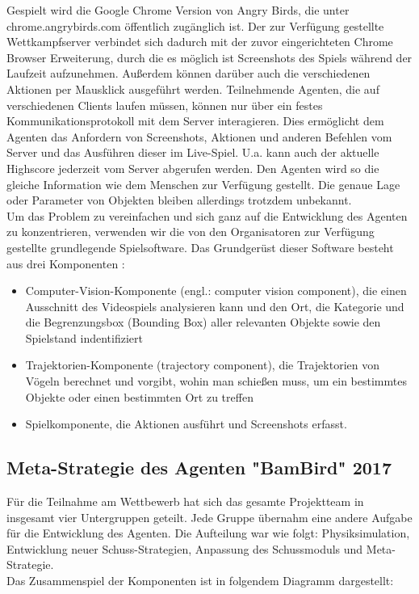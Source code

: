 Gespielt wird die Google Chrome Version von Angry Birds, die unter chrome.angrybirds.com öffentlich zugänglich ist. Der zur Verfügung gestellte Wettkampfserver verbindet sich dadurch mit der zuvor eingerichteten Chrome Browser Erweiterung, durch die es möglich ist Screenshots des Spiels während der Laufzeit aufzunehmen. Au\ss erdem können darüber auch die verschiedenen Aktionen per Mausklick ausgeführt werden. Teilnehmende Agenten, die auf verschiedenen Clients laufen müssen, können nur über ein festes Kommunikationsprotokoll mit dem Server interagieren. Dies ermöglicht dem Agenten das Anfordern von Screenshots, Aktionen und anderen Befehlen vom Server und das Ausführen dieser im Live-Spiel. U.a. kann auch der aktuelle Highscore jederzeit vom Server abgerufen werden. Den Agenten wird so die gleiche Information wie dem Menschen zur Verfügung gestellt. Die genaue Lage oder Parameter von Objekten bleiben allerdings trotzdem unbekannt.\\
Um das Problem zu vereinfachen und sich ganz auf die Entwicklung des Agenten zu konzentrieren, verwenden wir die von den Organisatoren zur Verfügung gestellte grundlegende Spielsoftware. Das Grundgerüst dieser Software besteht aus drei Komponenten \cite{dudeliberately}: 

\begin{itemize}
\item Computer-Vision-Komponente (engl.: computer vision component), die einen Ausschnitt des Videospiels analysieren kann und den Ort, die Kategorie und die Begrenzungsbox (Bounding Box) aller relevanten Objekte sowie den Spielstand indentifiziert
\item Trajektorien-Komponente (trajectory component), die Trajektorien von Vögeln berechnet und vorgibt, wohin man schie\ss en muss, um ein bestimmtes Objekte oder einen bestimmten Ort zu treffen
\item Spielkomponente, die Aktionen ausführt und Screenshots erfasst.
\end{itemize}

\subsection{Meta-Strategie des Agenten "BamBird" 2017}
Für die Teilnahme am Wettbewerb hat sich das gesamte Projektteam in insgesamt vier Untergruppen geteilt. Jede Gruppe übernahm eine andere Aufgabe für die Entwicklung des Agenten. Die Aufteilung war wie folgt: Physiksimulation, Entwicklung neuer Schuss-Strategien, Anpassung des Schussmoduls und Meta-Strategie.\\
Das Zusammenspiel der Komponenten ist in folgendem Diagramm dargestellt:

